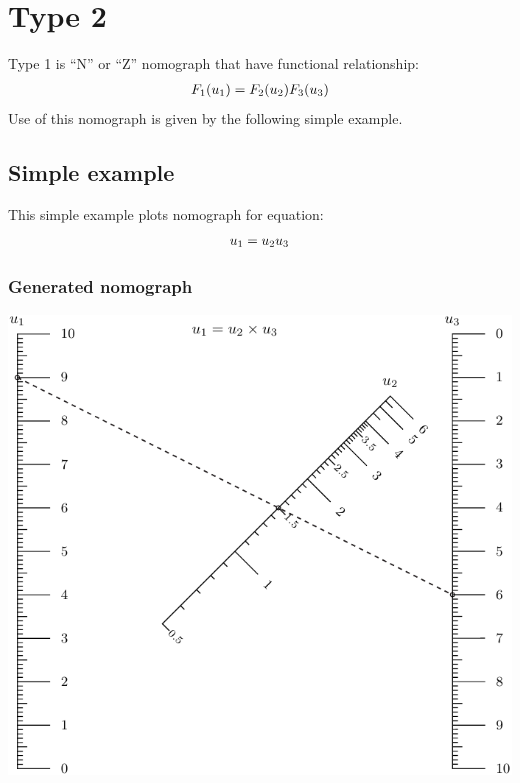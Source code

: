 \documentclass[a4paper,11pt,english]{sphinxmanual}
\begin{document}
\section{Type 2}
\label{types/types:type2-ref}\label{types/types:type-2}
Type 1 is ``N'' or ``Z'' nomograph that have functional relationship:
\begin{gather}
\begin{split}F_1(u_1) = F_2(u_2) F_3(u_3)\end{split}\notag
\end{gather}
Use of this nomograph is given by the following
simple example.


\subsection{Simple example}
\label{types/types:id1}
This simple example plots nomograph for equation:
\begin{gather}
\begin{split}u_1 = u_2 u_3\end{split}\notag
\end{gather}

\subsubsection{Generated nomograph}
\label{types/types:id2}
\includegraphics{ex_type2_nomo_1.pdf}
\end{document}
